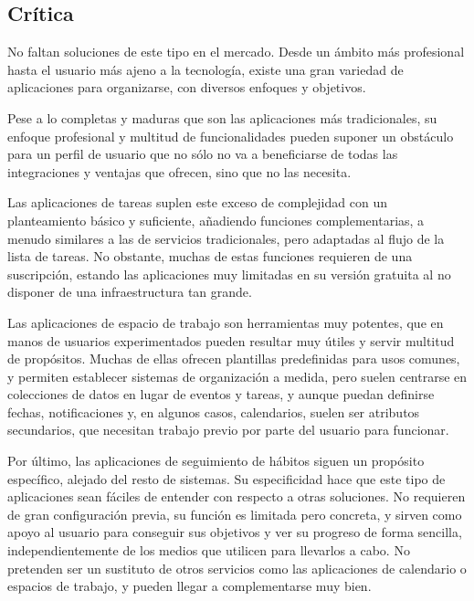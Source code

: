 \documentclass[10pt, a4paper]{aqademic}
\begin{document}
\subsection*{Crítica}

No faltan soluciones de este tipo en el mercado. Desde un ámbito más profesional hasta el usuario más ajeno a la tecnología, existe una gran variedad de aplicaciones para organizarse, con diversos enfoques y objetivos. 

Pese a lo completas y maduras que son las aplicaciones más tradicionales, su enfoque profesional y multitud de funcionalidades pueden suponer un obstáculo para un perfil de usuario que no sólo no va a beneficiarse de todas las integraciones y ventajas que ofrecen, sino que no las necesita. 

\medskip

Las aplicaciones de tareas suplen este exceso de complejidad con un planteamiento básico y suficiente, añadiendo funciones complementarias, a menudo similares a las de servicios tradicionales, pero adaptadas al flujo de la lista de tareas. No obstante, muchas de estas funciones requieren de una suscripción, estando las aplicaciones muy limitadas en su versión gratuita al no disponer de una infraestructura tan grande. 

\medskip

Las aplicaciones de espacio de trabajo son herramientas muy potentes, que en manos de usuarios experimentados pueden resultar muy útiles y servir multitud de propósitos. Muchas de ellas ofrecen plantillas predefinidas para usos comunes, y permiten establecer sistemas de organización a medida, pero suelen centrarse en colecciones de datos en lugar de eventos y tareas, y aunque puedan definirse fechas, notificaciones y, en algunos casos, calendarios, suelen ser atributos secundarios, que necesitan trabajo previo por parte del usuario para funcionar.

\medskip

Por último, las aplicaciones de seguimiento de hábitos siguen un propósito específico, alejado del resto de sistemas. Su especificidad hace que este tipo de aplicaciones sean fáciles de entender con respecto a otras soluciones. No requieren de gran configuración previa, su función es limitada pero concreta, y sirven como apoyo al usuario para conseguir sus objetivos y ver su progreso de forma sencilla, independientemente de los medios que utilicen para llevarlos a cabo. No pretenden ser un sustituto de otros servicios como las aplicaciones de calendario o espacios de trabajo, y pueden llegar a complementarse muy bien.
\end{document}
